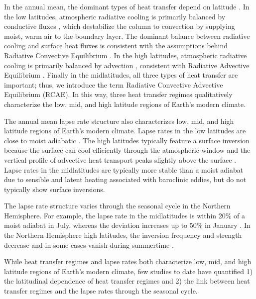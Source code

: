 \documentclass{ametsocV5}
\begin{document}
In the annual mean, the dominant types of heat transfer depend on latitude \citep[e.g., see Fig.~6.1 in][]{hartmann2016}. In the low latitudes, atmospheric radiative cooling is primarily balanced by conductive fluxes \citep{riehl1958}, which destabilize the column to convection by supplying moist, warm air to the boundary layer. The dominant balance between radiative cooling and surface heat fluxes is consistent with the assumptions behind Radiative Convective Equilibrium \citep[RCE,][]{wing2018}. In the high latitudes, atmospheric radiative cooling is primarily balanced by advection \citep{nakamura1988}, consistent with Radiative Advective Equilibrium \citep[RAE,][]{cronin2016}. Finally in the midlatitudes, all three types of heat transfer are important; thus, we introduce the term Radiative Convective Advective Equilibrium (RCAE). In this way, three heat transfer regimes qualitatively characterize the low, mid, and high latitude regions of Earth's modern climate.

The annual mean lapse rate structure also characterizes low, mid, and high latitude regions of Earth's modern climate. Lapse rates in the low latitudes are close to moist adiabatic \citep{stone1979,betts1982,xu1989,williams1993}. The high latitudes typically feature a surface inversion \citep[e.g., see Fig.~1.3 in][]{hartmann2016} because the surface can cool efficiently through the atmospheric window \citep{cronin2016} and the vertical profile of advective heat transport peaks slightly above the surface \citep{oort1974, overland1994, hahn2020, cardinale2021}. Lapse rates in the midlatitudes are typically more stable than a moist adiabat \citep{stone1979,korty2007} due to sensible and latent heating associated with baroclinic eddies, but do not typically show surface inversions.

The lapse rate structure varies through the seasonal cycle in the Northern Hemisphere. For example, the lapse rate in the midlatitudes is within 20\% of a moist adiabat in July, whereas the deviation increases up to 50\% in January \citep{stone1979}. In the Northern Hemisphere high latitudes, the inversion frequency and strength decrease \citep{bradley1992, tjernstrom2009, devasthale2010, zhang2011, cronin2016} and in some cases vanish during summertime \citep{stone1979}.

While heat transfer regimes and lapse rates both characterize low, mid, and high latitude regions of Earth's modern climate, few studies to date have quantified 1) the latitudinal dependence of heat transfer regimes and 2) the link between heat transfer regimes and the lapse rates through the seasonal cycle.
\end{document}
